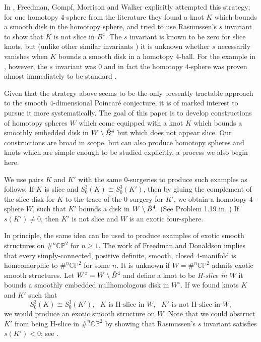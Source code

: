 \documentclass [11pt]{amsart}
\theoremstyle{remark}
\def\CP{\mathbb{CP}^2}
\def\Wo{W^{\circ}}
\newcommand\intB{\smash{\mathring{B}^4}}
\begin{document}
In \cite{FGMW}, Freedman, Gompf, Morrison and Walker explicitly attempted this strategy; for one homotopy 4-sphere from the literature they found  a knot $K$ which bounds a smooth disk in the homotopy sphere, and tried to use Rasmussen's $s$ invariant to show that $K$ is not slice in $B^4$. The $s$ invariant is known to be zero for slice knots, but (unlike other similar invariants \cite{OStau, km}) it is unknown whether $s$ necessarily vanishes when $K$ bounds a smooth disk in a homotopy $4$-ball. For the example in \cite{FGMW}, however, the $s$ invariant was $0$ and in fact the homotopy $4$-sphere was proven almost immediately to be standard \cite{akbulutCS}. 

Given that the strategy above seems to be the only presently tractable approach to the smooth $4$-dimensional Poincar\'e conjecture, it is of marked interest to pursue it more systematically.  The goal of this paper is to develop constructions of homotopy spheres $W$ which come equipped with a knot $K$ which bounds a smoothly embedded disk in $W \setminus \intB$ but which does not appear slice. Our constructions are broad in scope, but can also produce homotopy spheres and knots which are simple enough to be studied explicitly, a process we also begin here.

We use pairs $K$ and $K'$ with the same $0$-surgeries to produce such examples as follows: If $K$ is slice and $S^3_0(K)\cong S^3_0(K')$, then by gluing the complement of the slice disk for $K$ to the trace of the $0$-surgery for $K'$, we obtain a homotopy $4$-sphere $W$, such that $K'$ bounds a disk in $W \setminus \intB$. (See Problem 1.19 in \cite{KirbyList}.) If $s(K') \neq 0$, then $K'$ is not slice and $W$ is an exotic four-sphere.



In principle, the same idea can be used to produce examples of exotic smooth structures on $\#^n \CP$ for $n \geq 1$. The work of Freedman \cite{Freedman} and Donaldson \cite{Donaldson} implies that every simply-connected, positive definite, smooth, closed $4$-manifold is homeomorphic to $\#^n \CP$ for some $n$. It is unknown if $W=\#^n \CP$ admits exotic smooth structures. Let $\Wo = W \setminus \intB$ and define a knot to be {\em H-slice in $W$} it bounds a smoothly embedded nullhomologous disk in $\Wo$. If we found knots $K$ and $K'$ such that 
\[
S^3_0(K)\cong S^3_0(K'), \ \ \ K \text{ is H-slice in }W,   \ \ \ K' \text{ is not H-slice in }W,
\]
we would produce an exotic smooth structure on $W$. Note that we could obstruct $K'$ from being H-slice in $\#^n \CP$ by showing that Rasmussen's $s$ invariant satisfies $s(K') < 0$; see \cite{MMSW}.  
\end{document}
